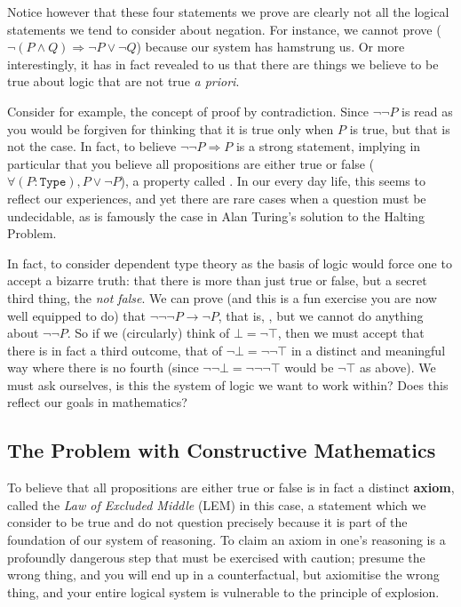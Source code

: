 \documentclass[11pt]{article}
\begin{document}
Notice however that these four statements we prove are clearly not all the logical statements we tend to consider about negation. For instance, we cannot prove  ($\neg (P \wedge Q) \Rightarrow \neg P \vee \neg Q$) because our system has hamstrung us. Or more interestingly, it has in fact revealed to us that there are things we believe to be true about logic that are not true \emph{a priori}.

Consider for example, the concept of proof by contradiction. Since $\neg \neg P$ is read as  you would be forgiven for thinking that it is true only when $P$ is true, but that is not the case. In fact, to believe $\neg \neg P \Rightarrow P$ is a strong statement, implying in particular that you believe all propositions are either true or false ($\forall (P \colon \mathtt{Type}), P \vee \neg P$), a property called . In our every day life, this seems to reflect our experiences, and yet there are rare cases when a question must be undecidable, as is famously the case in Alan Turing's solution to the Halting Problem.

In fact, to consider dependent type theory as the basis of logic would force one to accept a bizarre truth: that there is more than just true or false, but a secret third thing, the \emph{not false}. We can prove (and this is a fun exercise you are now well equipped to do) that $\neg \neg \neg P \to \neg P$, that is, , but we cannot do anything about $\neg \neg P$. So if we (circularly) think of $\bot = \neg \top$, then we must accept that there is in fact a third outcome, that of $\neg \bot = \neg \neg \top$ in a distinct and meaningful way where there is no fourth (since $\neg \neg \bot = \neg \neg \neg \top$ would be $\neg \top$ as above). We must ask ourselves, is this the system of logic we want to work within? Does this reflect our goals in mathematics?

\subsection{The Problem with Constructive Mathematics}

To believe that all propositions are either true or false is in fact a distinct \textbf{axiom}, called the \emph{Law of Excluded Middle} (LEM) in this case, a statement which we consider to be true and do not question precisely because it is part of the foundation of our system of reasoning. To claim an axiom in one's reasoning is a profoundly dangerous step that must be exercised with caution; presume the wrong thing, and you will end up in a counterfactual, but axiomitise the wrong thing, and your entire logical system is vulnerable to the principle of explosion.
\end{document}

